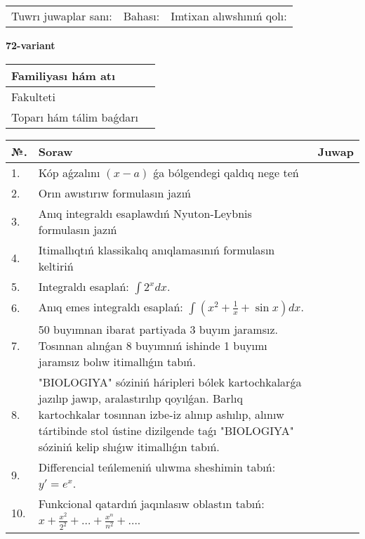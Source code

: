 \documentclass{article}
\begin{document}
\vspace{1cm}

\begin{tabular}{ c c c }
Tuwrı juwaplar sanı: \underline{\hspace{2cm}} & Bahası: \underline{\hspace{2cm}} & Imtixan alıwshınıń qolı: \underline{\hspace{2cm}} \\
\end{tabular}

\newpage

\begin{center}\textbf{72-variant}\end{center}

\bgroup
\def\arraystretch{1.5}
\begin{tabular}{ |m{6cm}|m{10cm}| }
  \hline
  Familiyası hám atı & \\
  \hline
  Fakulteti &\\
  \hline
  Toparı hám tálim baǵdarı & \\
  \hline
\end{tabular}
\egroup

\vspace{0.5cm}

\bgroup
\def\arraystretch{2}
\begin{tabular}{ |l|m{8cm}|m{7cm}| }
  \hline
  №. & Soraw & Juwap \\
  \hline
  1. & Kóp aǵzalını $(x - a)$ ǵa bólgendegi qaldıq nege teń &  \\
  \hline
  2. & Orın awıstırıw formulasın jazıń &  \\
  \hline
  3. & Anıq integraldı esaplawdıń Nyuton-Leybnis formulasın jazıń &  \\
  \hline
  4. & Itimallıqtıń klassikalıq anıqlamasınıń formulasın keltiriń &  \\
  \hline
  5. & Integraldı esaplań: $\displaystyle\int {2^{x}dx} $. &  \\
  \hline
  6. & Anıq emes integraldı esaplań: $\displaystyle\int(x^{2}+\frac{1}{x} + \sin x)dx$. &  \\
  \hline
  7. & 50 buyımnan ibarat partiyada 3 buyım jaramsız. Tosınnan alınǵan 8 buyımnıń ishinde 1 buyımı jaramsız bolıw itimallıǵın tabıń. &  \\
  \hline
  8. & "BIOLOGIYA" sóziniń háripleri bólek kartochkalarǵa jazılıp jawıp, aralastırılıp qoyılǵan. Barlıq kartochkalar tosınnan izbe-iz alınıp ashılıp, alınıw tártibinde stol ústine dizilgende taǵı "BIOLOGIYA" sóziniń kelip shıǵıw itimallıǵın tabıń. &  \\
  \hline
  9. & Differencial teńlemeniń ulıwma sheshimin tabıń: $y'=e^{x}$. &  \\
  \hline
  10. & Funkcional qatardıń jaqınlasıw oblastın tabıń: $\displaystyle x + \frac{x^{2}}{2^{2}} + \ldots + \frac{x^{n}}{n^{2}} + \ldots$. &  \\
  \hline
\end{tabular}
\egroup
\end{document}
